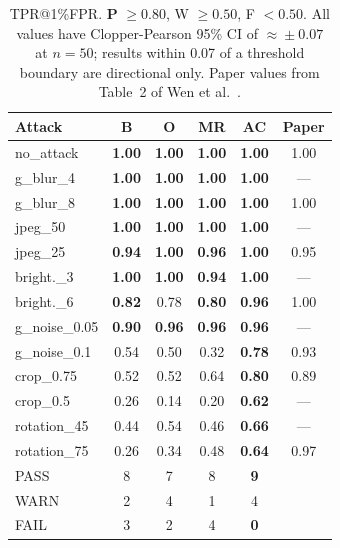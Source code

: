 \documentclass[10pt,twocolumn]{article}
\newcommand{\pass}[1]{\textcolor{passgreen}{\textbf{#1}}}
\newcommand{\warn}[1]{\textcolor{warnamber}{#1}}
\newcommand{\fail}[1]{\textcolor{failred}{#1}}
\begin{document}
\begin{table}[htbp]
  \centering
  \caption{TPR@1\%FPR. \pass{P} $\geq 0.80$, \warn{W} $\geq 0.50$,
    \fail{F} $< 0.50$.
    All values have Clopper-Pearson 95\% CI of $\approx\!\pm 0.07$
    at $n{=}50$; results within 0.07 of a threshold boundary are
    directional only.
    Paper values from Table~2 of Wen et al.~\cite{wen2023treering}.}
  \label{tab:tpr}
  \setlength{\tabcolsep}{3pt}
  \small
  \begin{tabular}{lccccc}
    \toprule
    \textbf{Attack} & \textbf{B} & \textbf{O}
      & \textbf{MR} & \textbf{AC} & \textbf{Paper} \\
    \midrule
    no\_attack     & \pass{1.00} & \pass{1.00} & \pass{1.00} & \pass{\bf 1.00} & 1.00 \\
    g\_blur\_4     & \pass{1.00} & \pass{1.00} & \pass{1.00} & \pass{\bf 1.00} & --- \\
    g\_blur\_8     & \pass{1.00} & \pass{1.00} & \pass{1.00} & \pass{\bf 1.00} & 1.00 \\
    jpeg\_50       & \pass{1.00} & \pass{1.00} & \pass{1.00} & \pass{\bf 1.00} & --- \\
    jpeg\_25       & \pass{0.94} & \pass{1.00} & \pass{0.96} & \pass{\bf 1.00} & 0.95 \\
    bright.\_3     & \pass{1.00} & \pass{1.00} & \pass{0.94} & \pass{\bf 1.00} & --- \\
    bright.\_6     & \pass{0.82} & \warn{0.78} & \pass{0.80} & \pass{\bf 0.96} & 1.00 \\
    g\_noise\_0.05 & \pass{0.90} & \pass{0.96} & \pass{0.96} & \pass{\bf 0.96} & --- \\
    g\_noise\_0.1  & \warn{0.54} & \warn{0.50} & \fail{0.32} & \warn{\bf 0.78} & 0.93 \\
    crop\_0.75     & \warn{0.52} & \warn{0.52} & \warn{0.64} & \pass{\bf 0.80} & 0.89 \\
    crop\_0.5      & \fail{0.26} & \fail{0.14} & \fail{0.20} & \warn{\bf 0.62} & --- \\
    rotation\_45   & \fail{0.44} & \warn{0.54} & \fail{0.46} & \warn{\bf 0.66} & --- \\
    rotation\_75   & \fail{0.26} & \fail{0.34} & \fail{0.48} & \warn{\bf 0.64} & 0.97 \\
    \midrule
    PASS & 8 & 7 & 8 & \textbf{9} \\
    WARN & 2 & 4 & 1 & 4 \\
    FAIL & 3 & 2 & 4 & \textbf{0} \\
    \bottomrule
  \end{tabular}
\end{table}
\end{document}
